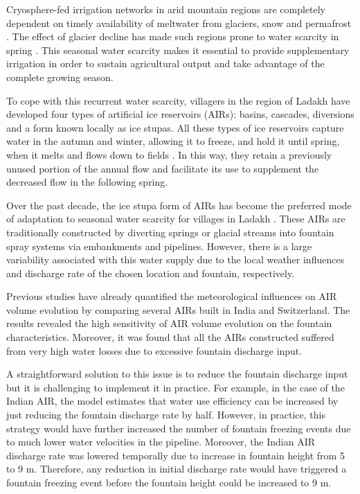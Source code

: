 \documentclass[tc, manuscript]{copernicus}
\begin{document}
\introduction

Cryosphere-fed irrigation networks in arid mountain regions are completely dependent on timely availability of
meltwater from glaciers, snow and permafrost \citep{farhanHydrologicalRegimesConjunction2015}.  The effect of
glacier decline has made such regions prone to water scarcity in spring \citep{ipccChapterHighMountain2019}.
This seasonal water scarcity makes it essential to provide supplementary irrigation in order to sustain
agricultural output and take advantage of the complete growing season.

To cope with this recurrent water scarcity, villagers in the region of Ladakh have developed four types of
artificial ice reservoirs (AIRs): basins, cascades, diversions and a form known locally as ice stupas. All these
types of ice reservoirs capture water in the autumn and winter, allowing it to freeze, and hold it until spring,
when it melts and flows down to fields \citep{vinceGlacierMan2009, clouseLadakhArtificialGlaciers2017,
nusserSociohydrologyArtificialGlaciers2019}. In this way, they retain a previously unused portion of the annual
flow and facilitate its use to supplement the decreased flow in the following spring. 

Over the past decade, the ice stupa form of AIRs has become the preferred mode of adaptation to seasonal water
scarcity for villages in Ladakh \citep{wangchukIceStupaCompetition2020}. These AIRs are traditionally
constructed by diverting springs or glacial streams into fountain spray systems via embankments and pipelines.
However, there is a large variability associated with this water supply due to the local weather influences and
discharge rate of the chosen location and fountain, respectively. 

Previous studies \citep{balasubramanianInfluenceMeteorologicalConditions2022,
oerlemansBriefCommunicationGrowth2021} have already quantified the meteorological influences on AIR volume
evolution by comparing several AIRs built in India and Switzerland. The results revealed the high sensitivity of
AIR volume evolution on the fountain characteristics. Moreover, it was found that all the AIRs constructed
suffered from very high water losses due to excessive fountain discharge input. 

A straightforward solution to this issue is to reduce the fountain discharge input but it is challenging to
implement it in practice. For example, in the case of the Indian AIR, the model estimates that water use
efficiency can be increased by just reducing the fountain discharge rate by half. However, in practice, this
strategy would have further increased the number of fountain freezing events due to much lower water velocities
in the pipeline. Moreover, the Indian AIR discharge rate was lowered temporally due to increase in fountain
height from 5 to 9 m. Therefore, any reduction in initial discharge rate would have triggered a fountain
freezing event before the fountain height could be increased to 9 m.
\end{document}
